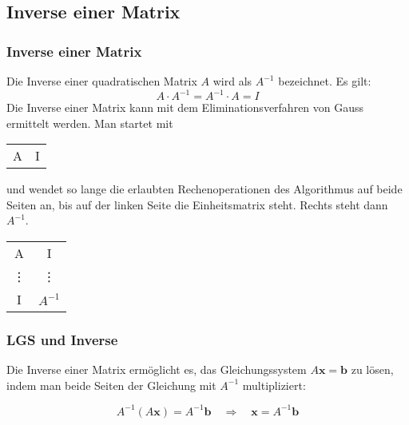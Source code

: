 \documentclass{beamer}
\begin{document}
\subsection{Inverse einer Matrix}
\begin{frame}
  \frametitle{Inverse einer Matrix}
  
  Die Inverse einer quadratischen Matrix $A$ wird als $A^{-1}$ bezeichnet. Es gilt:
  $$ A \cdot A^{-1} = A^{-1} \cdot A =  I$$
  \vspace{0.3cm}
  Die Inverse einer Matrix kann mit dem Eliminationsverfahren von Gauss ermittelt werden. Man startet mit
  \begin{center}
    \begin{tabular}{c|c}
      A & I\\      
    \end{tabular}
  \end{center}
  und wendet so lange die erlaubten Rechenoperationen des Algorithmus auf beide Seiten an, bis auf der linken Seite die Einheitsmatrix steht. 
  Rechts steht dann $A^{-1}$.
  \begin{center}
    \begin{tabular}{c|c}
      A & I\\ 
      \vdots & \vdots \\
      I & $A^{-1}$
    \end{tabular}
  \end{center}

\end{frame}


\begin{frame}
  \frametitle{LGS und Inverse}
  Die Inverse einer Matrix ermöglicht es, das Gleichungssystem $A \mathbf{x} = \mathbf{b}$ zu lösen, indem man beide Seiten der Gleichung mit $A^{-1}$ multipliziert:
  
  \[
  A^{-1} (A \mathbf{x}) = A^{-1} \mathbf{b} \quad \Rightarrow \quad \mathbf{x} = A^{-1} \mathbf{b}
  \]
\end{frame}
\end{document}
